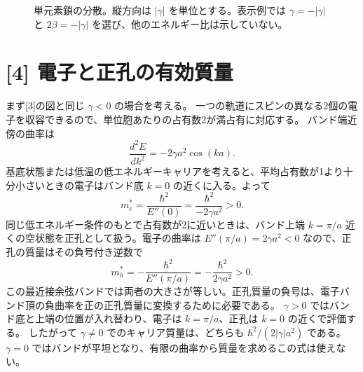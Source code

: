 \documentclass[11pt,a4paper]{article}
\begin{document}
\begin{figure}[htbp]
\centering
{}
\caption{単元素鎖の分散。縦方向は $|\gamma|$ を単位とする。表示例では $\gamma=-|\gamma|$ と $2\beta=-|\gamma|$ を選び、他のエネルギー比は示していない。}
\end{figure}

\section*{[4] 電子と正孔の有効質量}
まず[3]の図と同じ $\gamma<0$ の場合を考える。
一つの軌道にスピンの異なる2個の電子を収容できるので、単位胞あたりの占有数2が満占有に対応する。
バンド端近傍の曲率は
\begin{equation}
  \frac{d^2E}{dk^2}=-2\gamma a^2\cos(ka).
\end{equation}
基底状態または低温の低エネルギーキャリアを考えると、平均占有数が1より十分小さいときの電子はバンド底 $k=0$ の近くに入る。よって
\begin{equation}
  \boxed{m_e^*=\frac{\hbar^2}{E''(0)}
  =\frac{\hbar^2}{-2\gamma a^2}>0.}
\end{equation}
同じ低エネルギー条件のもとで占有数が2に近いときは、バンド上端 $k=\pi/a$ 近くの空状態を正孔として扱う。電子の曲率は $E''(\pi/a)=2\gamma a^2<0$ なので、正孔の質量はその負号付き逆数で
\begin{equation}
  \boxed{m_h^*=-\frac{\hbar^2}{E''(\pi/a)}
  =-\frac{\hbar^2}{2\gamma a^2}>0.}
\end{equation}
この最近接余弦バンドでは両者の大きさが等しい。正孔質量の負号は、電子バンド頂の負曲率を正の正孔質量に変換するために必要である。
$\gamma>0$ ではバンド底と上端の位置が入れ替わり、電子は $k=\pi/a$、正孔は $k=0$ の近くで評価する。
したがって $\gamma\ne0$ でのキャリア質量は、どちらも $\hbar^2/(2|\gamma|a^2)$ である。
$\gamma=0$ ではバンドが平坦となり、有限の曲率から質量を求めるこの式は使えない。
\end{document}
